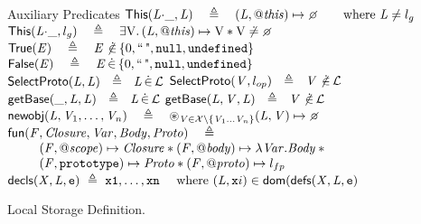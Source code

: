 \documentclass{article}
\begin{document}
%
\begin{display}{Auxiliary Predicates}
$\pickThis(\E{L}\sv\_,\E{L}) ~~~\triangleq~~~ (\E{L},\thisp)\pointsto\none\qquad\text{where }\E{L}\neq\lgo$\\
$\pickThis(\E{L}\sv\_,\lgo) ~~~\triangleq~~~ \exists\V{V}\st(\E{L},\thisp)\pointsto\V{V}\sep\V{V}\not\doteq\none$\\[\gap]
%
$\istrue(\E{E}) ~~~\triangleq~~~ \E{E}\notdotin \falsity$\\
$\isfalse(\E{E}) ~~~\triangleq~~~ \E{E}\dotin\falsity$\\[\gap]
%
$\objOrGlob(\E{L},\E{L}) ~~\triangleq~~ \E{L}\dotin\loc $\qquad\quad
$\objOrGlob(\E{V},\lop) ~~\triangleq~~ \E{V}\notdotin\loc $\\[\gap]
%
$\getBase(\_,\E{L},\E{L})  ~~\triangleq~~  \E{L}\dotin\loc $\qquad\qquad
$\getBase(\E{L},\E{V},\E{L})  ~~\triangleq~~  \E{V}\notdotin\loc$\\[\gap]
%
$\newobj(\E{L},\E{V}_1,\dots,\E{V}_n) ~~~\triangleq~~~ \bigsep_{\E{V} \in \vars\setminus\{\E{V}_1\dots\E{V}_n\}} (\E{L},\E{V}) \pointsto\none$\\[\gap]
%
$\begin{array}{l}
        \hspace{-5pt}\func(\E{F},\E{Closure},\E{Var},\E{Body},\E{Proto}) ~~~\triangleq
        \\ \qquad 
                (\E{F},\fscopep)\pointsto \E{Closure} \sep
                (\E{F},\bodyp )\pointsto \lambda\E{Var}.\E{Body} \sep{}\\
        \qquad  (\E{F},\js{prototype} )\pointsto \E{Proto} \sep
                (\E{F},\protop )\pointsto \lfp
\end{array}$\\[\gap]
%
$\vardecls(\E{X},\E{L},\js e) ~\triangleq~ \js{x1},\ldots,\js{xn}\quad\text{ where }(\E{L},\js xi)\in\domain(\defs(\E{X},\E{L},\js e)$
%
\end{display}
%
%
%
\begin{display}{Local Storage Definition.}
%
\\
 \\
\\
\\
 \\
 \\[\gap]
%
%
\end{display}
\end{document}
